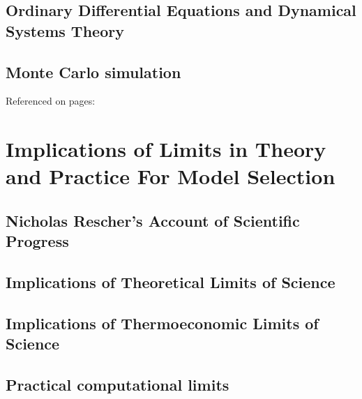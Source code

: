 \subsection{Ordinary Differential Equations and Dynamical Systems Theory}
\label{SODEs}
\subsection{Monte Carlo simulation}
Referenced on pages: \pageref{TMSmodel}
\label{MonteCarlo}


\section{Implications of Limits in Theory and Practice For Model Selection}
\label{limits}
\subsection{Nicholas Rescher's Account of Scientific Progress}

\subsection{Implications of Theoretical Limits of Science}
\label{theorylimits}
\subsection{Implications of Thermoeconomic Limits of Science}

\subsection{Practical computational limits}
\label{complimits}


